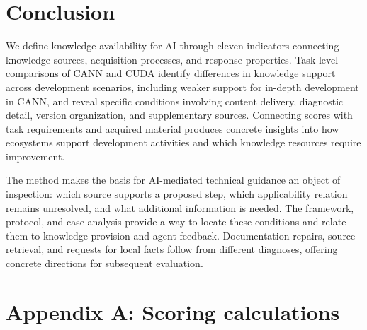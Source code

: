 \documentclass[manuscript,review,anonymous]{acmart}
\begin{document}
\section{Conclusion}\label{conclusion}

We define knowledge availability for AI through eleven indicators connecting knowledge sources, acquisition processes, and response properties. Task-level comparisons of CANN and CUDA identify differences in knowledge support across development scenarios, including weaker support for in-depth development in CANN, and reveal specific conditions involving content delivery, diagnostic detail, version organization, and supplementary sources. Connecting scores with task requirements and acquired material produces concrete insights into how ecosystems support development activities and which knowledge resources require improvement.

The method makes the basis for AI-mediated technical guidance an object of inspection: which source supports a proposed step, which applicability relation remains unresolved, and what additional information is needed. The framework, protocol, and case analysis provide a way to locate these conditions and relate them to knowledge provision and agent feedback. Documentation repairs, source retrieval, and requests for local facts follow from different diagnoses, offering concrete directions for subsequent evaluation.

\section*{Appendix A: Scoring calculations}\label{appendix-a-scoring-calculations}
\end{document}
